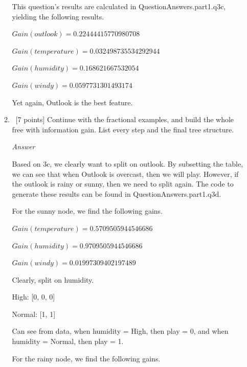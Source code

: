 \documentclass[12pt, fullpage,letterpaper]{article}
\begin{document}
\begin{enumerate}
\begin{enumerate}
\vspace{5mm}

This question's results are calculated in QuestionAnswers.part1.q3c, yielding the following results.

\vspace{5mm}

$Gain(outlook)=0.22444415770980708$

$Gain(temperature)=0.032498735534292944$

$Gain(humidity)=0.168621667532054$

$Gain(windy)=0.0597731301493174$

\vspace{5mm}

Yet again, Outlook is the best feature.

\item~[7 points] Continue with the fractional examples, and build the whole free with information gain. List every step and the final tree structure.

\emph{Answer}

Based on 3c, we clearly want to split on outlook. By subsetting the table, we can see that when Outlook is overcast, then we will play. However, if the outlook is rainy or sunny, then we need to split again. The code to generate these results can be found in QuestionAnswers.part1.q3d.

\vspace{5mm}

For the sunny node, we find the following gains.

$Gain(temperature)=0.5709505944546686$

$Gain(humidity)=0.9709505944546686$

$Gain(windy)=0.01997309402197489$

\vspace{5mm}

Clearly, split on humidity.

\vspace{5mm}

High: [0, 0, 0]

Normal: [1, 1]

\vspace{5mm}

Can see from data, when humidity = High, then play = 0, and when humidity = Normal, then play = 1.

\vspace{5mm}

For the rainy node, we find the following gains.


\end{enumerate}
\end{enumerate}
\end{document}

